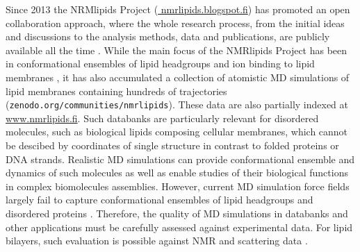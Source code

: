 \documentclass[journal=jpcbfk,manuscript=article,layout=twocolumn]{achemso}
\begin{document}
Since 2013 the NRMlipids Project (\url{ nmrlipids.blogspot.fi}) has
promoted an open collaboration approach,
where the whole research process, from the initial ideas and discussions to
the analysis methods, data and publications, are publicly available all the time \cite{botan15}.
While the main focus of the NMRlipids Project has been in conformational ensembles
of lipid headgroups and ion binding to lipid membranes \cite{botan15,catte16,antila19},
it has also accumulated a collection 
of atomistic MD simulations of lipid membranes containing hundreds of trajectories ({\tt zenodo.org/communities/nmrlipids}).
These data are also partially indexed at \url{www.nmrlipids.fi}.
Such databanks are particularly relevant for disordered molecules, such as %
biological lipids composing cellular membranes, which cannot be descibed by coordinates of single structure in contrast to
folded proteins or DNA strands.
Realistic MD simulations can provide conformational ensemble and dynamics of such molecules as well as
enable studies of their biological functions in complex biomolecules assemblies.
However, current MD simulation force fields largely fail to capture conformational ensembles of lipid headgroups and
disordered proteins \cite{botan15,antila19,??}.
Therefore, the quality of MD simulations in databanks and other applications must be carefully assessed against
experimental data.
For lipid bilayers, such evaluation is possible against NMR and scattering data \cite{ollila16}.
\end{document}
